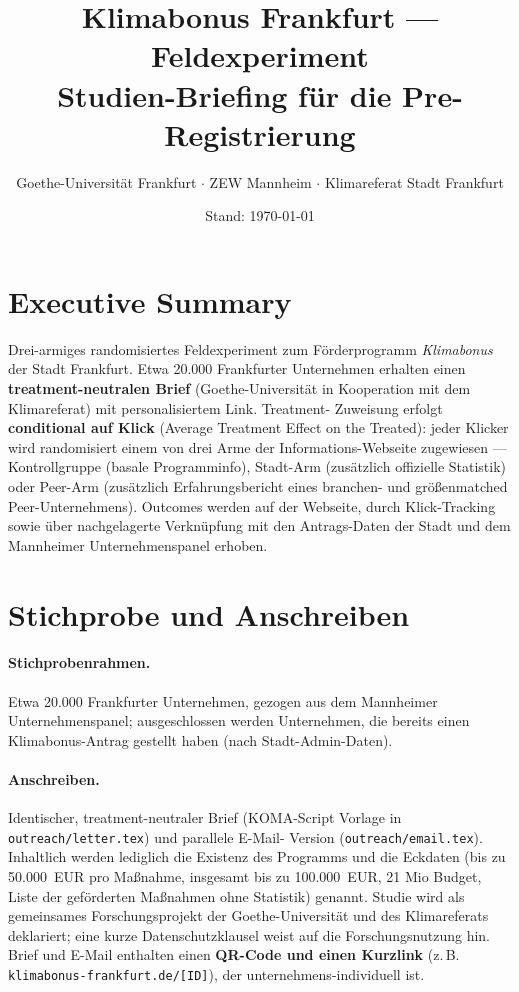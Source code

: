\documentclass[11pt, a4paper]{scrartcl}
\title{Klimabonus Frankfurt --- Feldexperiment\\
\Large Studien-Briefing für die Pre-Registrierung}
\author{Goethe-Universität Frankfurt \(\cdot\) ZEW Mannheim \(\cdot\)
        Klimareferat Stadt Frankfurt}
\date{Stand: \today}
\newcommand{\var}[1]{\texttt{\small #1}}
\begin{document}
\maketitle

\section*{Executive Summary}

Drei-armiges randomisiertes Feldexperiment zum Förderprogramm
\emph{Klimabonus} der Stadt Frankfurt. Etwa 20.000 Frankfurter Unternehmen
erhalten einen \textbf{treatment-neutralen Brief} (Goethe-Universität in
Kooperation mit dem Klimareferat) mit personalisiertem Link. Treatment-
Zuweisung erfolgt \textbf{conditional auf Klick} (Average Treatment Effect
on the Treated): jeder Klicker wird randomisiert einem von drei Arme der
Informations-Webseite zugewiesen --- Kontrollgruppe (basale Programminfo),
Stadt-Arm (zusätzlich offizielle Statistik) oder Peer-Arm (zusätzlich
Erfahrungsbericht eines branchen- und größenmatched Peer-Unternehmens).
Outcomes werden auf der Webseite, durch Klick-Tracking sowie über
nachgelagerte Verknüpfung mit den Antrags-Daten der Stadt und dem
Mannheimer Unternehmenspanel erhoben.

\section{Stichprobe und Anschreiben}

\paragraph{Stichprobenrahmen.} Etwa 20.000 Frankfurter Unternehmen,
gezogen aus dem Mannheimer Unternehmenspanel; ausgeschlossen werden
Unternehmen, die bereits einen Klimabonus-Antrag gestellt haben (nach
Stadt-Admin-Daten).

\paragraph{Anschreiben.} Identischer, treatment-neutraler Brief
(KOMA-Script Vorlage in \var{outreach/letter.tex}) und parallele E-Mail-
Version (\var{outreach/email.tex}). Inhaltlich werden lediglich die
Existenz des Programms und die Eckdaten (bis zu 50.000~EUR pro Maßnahme,
insgesamt bis zu 100.000~EUR, 21 Mio Budget, Liste der geförderten
Maßnahmen ohne Statistik) genannt.
Studie wird als gemeinsames Forschungsprojekt der Goethe-Universität und
des Klimareferats deklariert; eine kurze Datenschutzklausel weist auf die
Forschungsnutzung hin. Brief und E-Mail enthalten einen \textbf{QR-Code
und einen Kurzlink} (z.\,B. \texttt{klimabonus-frankfurt.de/[ID]}), der
unternehmens-individuell ist.
\end{document}
